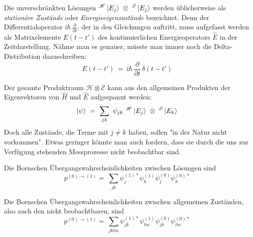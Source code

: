 \documentclass[12pt]{article}
\begin{document}
Die unverschränkten Lösungen $^\mathscr{H}\ket{E_j}\ \otimes\ ^\mathscr{E}\ket{E_j}$ werden üblicherweise als \emph{stationäre Zustände} oder \emph{Energieeigenzustände} bezeichnet. Denn der Differentialoperator $\mathrm{i}\hbar\,\frac{\partial}{\partial t}$, der in den Gleichungen auftritt, muss aufgefasst werden als Matrixelemente $E(t-t')$ des kontinuierlichen Energieoperators $\hat{E}$ in der Zeitdarstellung. Nähme man es genauer, müsste man immer noch die Delta-Distribution dazuschreiben: 
\begin{equation*}
E(t-t')\ =\ \mathrm{i}\hbar\,\frac{\partial}{\partial t}\,\delta(t-t')
\end{equation*}

Der gesamte Produktraum $\mathscr{H} \otimes \mathscr{E}$ kann aus den allgemeinen Produkten der Eigenvektoren von $\hat{H}$ und $\hat{E}$ aufgespannt werden:
\begin{equation}
\label{eq:general_state}
\ket{\psi}\ =\ \sum_{jk}\ \psi_{jk}\ ^\mathscr{H}\ket{E_j}\ \otimes\ ^\mathscr{E}\ket{E_k}
\end{equation}
Doch alle Zustände, die Terme mit $j \neq k$ haben, sollen "in der Natur nicht vorkommen". Etwas geringer könnte man auch fordern, dass sie durch die uns zur Verfügung stehenden Messprozesse nicht beobachtbar sind.

Die Bornschen Übergangswahrscheinlichkeiten zwischen Lösungen sind
\begin{equation} 
p^{(0)\rightarrow(1)} =\ \sum_{jk} \psi_j^{(1)*}\psi_k^{(1)}\psi_j^{(0)}\psi_k^{(0)*}
\end{equation}

Die Bornschen Übergangswahrscheinlichkeiten zwischen allgemeinen Zuständen, also auch den nicht beobachtbaren, sind
\begin{equation} 
p^{(0)\rightarrow(1)} =\ \sum_{jklm} \psi_{jk}^{(1)*}\psi_{lm}^{(1)}\psi_{jk}^{(0)}\psi_{lm}^{(0)*}
\end{equation}
\end{document}
